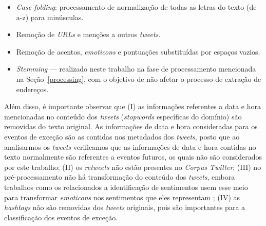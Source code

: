 \documentclass[
	12pt,				%
	oneside,			%
	a4paper,			%
	english,			%
	brazil				%
	]{abntex2ppgsi}
\begin{document}
{{{\begin{itemize}
\item \textit{Case folding}: processamento de normalização de todas as letras do texto (de a-z) para minúsculas.
\item Remoção de  \textit{URLs} e menções a outros \textit{tweets}.
\item Remoção de acentos, \textit{emoticons} e pontuações substituídas por espaços vazios.
\item \textit{Stemming} --- realizado neste trabalho na fase de processamento mencionada na Seção~\ref{processing}, com o objetivo de não afetar o processo de extração de endereços. 
\end{itemize}

Além disso, é importante observar que (I) as informações referentes a data e hora mencionadas no conteúdo dos \textit{tweets} (\textit{stopwords} específicas do domínio) são removidas do texto original. As informações de data e hora consideradas para os eventos de exceção são as contidas nos metadados dos \textit{tweets}, posto que ao analisarmos os \textit{tweets} verificamos que as informações de data e hora contidas no texto normalmente são referentes a eventos futuros, os quais não são considerados por este trabalho; (II) os \textit{retweets} não estão presentes no \textit{Corpus Twitter}; (III) no pré-processamento não há transformação do conteúdo dos \textit{tweets}, embora trabalhos como os relacionados a identificação de sentimentos usem esse meio para transformar \textit{emoticons} nos sentimentos que eles representam \cite{Zagal2016}; (IV) as \textit {hashtags} não são removidas dos \textit{tweets} originais, pois são importantes para a classificação dos eventos de exceção.

}}}
\end{document}
